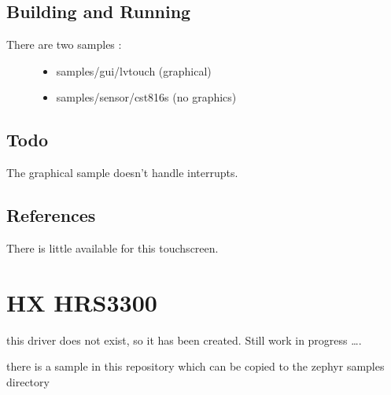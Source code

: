 \documentclass[letterpaper,10pt,english]{sphinxmanual}
\begin{document}
\begin{sphinxVerbatim}[commandchars=\\\{\}]
\end{sphinxVerbatim}


\subsection{Building and Running}
\label{\detokenize{drivers/cst816s:building-and-running}}\begin{description}
\item[{There are two samples :}] \leavevmode\begin{itemize}
\item {} 
samples/gui/lvtouch (graphical)

\item {} 
samples/sensor/cst816s (no graphics)

\end{itemize}

\end{description}


\subsection{Todo}
\label{\detokenize{drivers/cst816s:todo}}
The graphical sample doesn’t handle interrupts.


\subsection{References}
\label{\detokenize{drivers/cst816s:references}}
There is little available for this touchscreen.


\section{HX HRS3300}
\label{\detokenize{drivers/hrs3300:hx-hrs3300}}\label{\detokenize{drivers/hrs3300::doc}}
this driver does not exist, so it has been created.
Still work in progress ….

there is a sample in this repository which can be copied to the zephyr samples directory
\end{document}
